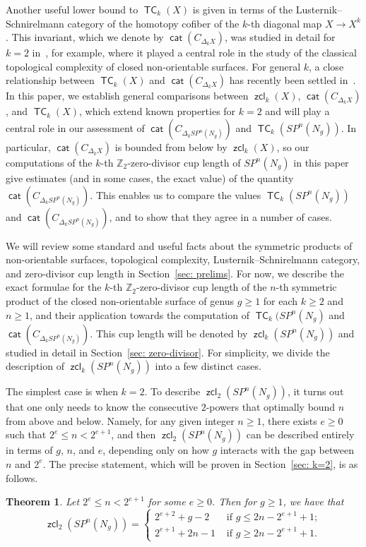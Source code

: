 \documentclass[amscd,amssymb,verbatim,10pt]{amsart}
\numberwithin{equation}{section}
\theoremstyle{plain}
\newtheorem{thm}{Theorem}[section]
\theoremstyle{definition}
\DeclareMathOperator{\cat}{{\mathsf{cat}}}
\DeclareMathOperator{\TC}{{\mathsf{TC}}}
\DeclareMathOperator{\zcl}{{\mathsf{zcl}}}
\def\Z{{\mathbb Z}}
\begin{document}
Another useful lower bound to $\TC_k(X)$ is given in terms of the Lusternik--Schnirelmann category of the homotopy cofiber of the $k$-th diagonal map $X\to X^k$. This invariant, which we denote by $\cat(C_{\Delta_kX})$, was studied in detail for $k=2$ in~\cite{GV,Dr1,Dr2,GGL}, for example, where it played a central role in the study of the classical topological complexity of closed non-orientable surfaces. For general $k$, a close relationship between $\TC_k(X)$ and $\cat(C_{\Delta_kX})$ has recently been settled in~\cite[Proposition~2.1~(2)]{CAC}. In this paper, we establish general comparisons between $\zcl_k(X)$, $\cat(C_{\Delta_kX})$, and $\TC_k(X)$, which extend known properties for $k=2$ and will play a central role in our assessment of $\cat(C_{\Delta_kSP^n(N_g)})$ and $\TC_k(SP^n(N_g))$. In particular, $\cat(C_{\Delta_kX})$ is bounded from below by $\zcl_k(X)$, so our computations of the $k$-th $\Z_2$-zero-divisor cup length of $SP^n(N_g)$ in this paper give estimates (and in some cases, the exact value) of the quantity $\cat(C_{\Delta_kSP^n(N_g)})$. This enables us to compare the values $\TC_k(SP^n(N_g))$ and $\cat(C_{\Delta_kSP^n(N_g)})$, and to show that they agree in a number of cases.

We will review some standard and useful facts about the symmetric products of non-orientable surfaces, topological complexity, Lusternik--Schnirelmann category, and zero-divisor cup length in Section~\ref{sec: prelims}. For now, we describe the exact formulae for the $k$-th $\Z_2$-zero-divisor cup length of the $n$-th symmetric product of the closed non-orientable surface of genus $g\ge 1$ for each $k\ge 2$ and $n\ge 1$, and their application towards the computation of $\TC_k(SP^n(N_g)$ and $\cat(C_{\Delta_kSP^n(N_g)})$. This cup length will be denoted by $\zcl_k(SP^n(N_g))$ and studied in detail in Section~\ref{sec: zero-divisor}. For simplicity, we divide the description of $\zcl_k(SP^n(N_g))$ into a few distinct cases.

The simplest case is when $k=2$. To describe $\zcl_2(SP^n(N_g))$, it turns out that one only needs to know the consecutive $2$-powers that optimally bound $n$ from above and below. Namely, for any given integer $n\ge 1$, there exists $e\ge 0$ such that $2^e\le n<2^{e+1}$, and then $\zcl_2(SP^n(N_g))$ can be described entirely in terms of $g$, $n$, and $e$, depending only on how $g$ interacts with the gap between $n$ and $2^e$. The precise statement, which will be proven in Section~\ref{sec: k=2}, is as follows. 

\begin{thm}\label{thm: zcl k=2}
  Let $2^e\le n< 2^{e+1}$ for some $e\ge 0$. Then for $g\ge 1$, we have that 
  \[\zcl_2(SP^n(N_g))=\begin{cases}
      2^{e+2}+g-2 & \text{ if } g\le 2n-2^{e+1}+1;
      \\
      2^{e+1}+2n-1 & \text{ if } g\ge 2n-2^{e+1}+1.
  \end{cases}
  \]
\end{thm}
\end{document}
